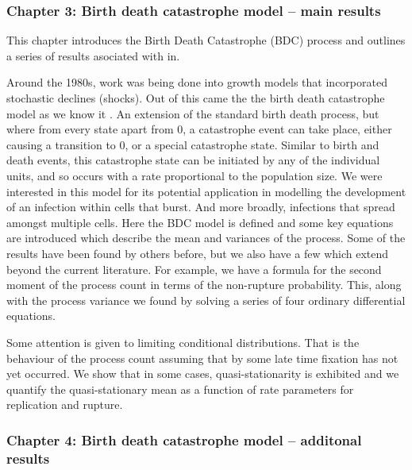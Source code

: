\subsubsection{Chapter 3: Birth death catastrophe model -- main results}

This chapter introduces the Birth Death Catastrophe (BDC) process and outlines a series of results asociated with in. \par


\noindent
Around the 1980s, work was being done into growth models that incorporated stochastic declines (shocks). Out
of this came the the birth death catastrophe model as we know it \cite{cairns2004extinction}\cite{brockwell1985extinction} \cite{brockwell1982birth} \cite{dori2018family}.  An extension of the standard birth death
process, but where from every state apart from 0, a catastrophe event can take place, either causing a transition
to 0, or a special catastrophe state. Similar to birth and death events, this catastrophe state can be initiated by
any of the individual units, and so occurs with a rate proportional to the population size. We were interested
in this model for its potential application in modelling the development of an infection within cells that burst.
And more broadly, infections that spread amongst multiple cells.
Here the BDC model is defined and some key equations are introduced which describe the mean and variances
of the process. Some of the results have been found by others before, but we also have a few which extend beyond
the current literature. For example, we have a formula for the second moment of the process count in terms of the non-rupture probability. This, along with the process variance we found by solving a series of four ordinary differential equations.\par

Some attention is given to limiting conditional distributions. That is the behaviour of the process count assuming that by some late time fixation has not yet occurred.  We show that in some cases, quasi-stationarity is exhibited and we quantify the quasi-stationary mean as a function of rate parameters for replication and rupture.






\subsubsection{Chapter 4: Birth death catastrophe model -- additonal results}

